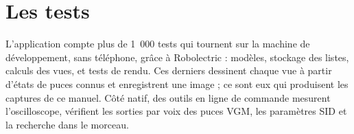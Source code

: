 \section{Les tests}
L'application compte plus de 1~000 tests qui tournent sur la machine de développement, sans téléphone, grâce à
Robolectric : modèles, stockage des listes, calculs des vues, et tests de rendu. Ces derniers dessinent chaque vue à
partir d'états de puces connus et enregistrent une image ; ce sont eux qui produisent les captures de ce manuel. Côté
natif, des outils en ligne de commande mesurent l'oscilloscope, vérifient les sorties par voix des puces VGM, les
paramètres SID et la recherche dans le morceau.
